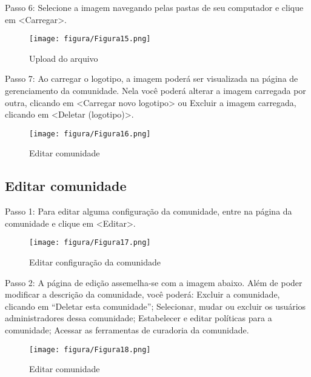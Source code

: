 \documentclass[12pt,hidelinks]{article}
\begin{document}
\newpage
    Passo 6: Selecione a imagem navegando pelas pastas de seu computador e clique em <Carregar>.
    
    \begin{figure}[!htp]
                \centering
                \texttt{[image: figura/Figura15.png]}
                \caption{Upload do arquivo}
            \label{Rotulo}
        \end{figure}
        
    Passo 7: Ao carregar o logotipo, a imagem poderá ser visualizada na página de gerenciamento da comunidade. Nela você poderá alterar a imagem carregada por outra, clicando em <Carregar novo logotipo> ou Excluir a imagem carregada, clicando em <Deletar (logotipo)>.
    
    \begin{figure}[!htp]
                \centering
                \texttt{[image: figura/Figura16.png]}
                \caption{Editar comunidade}
            \label{Rotulo}
        \end{figure}
        
    \subsection{Editar comunidade}
    
    Passo 1: Para editar alguma configuração da comunidade, entre na página da comunidade e clique em <Editar>.
    
    \begin{figure}[!htp]
                \centering
                \texttt{[image: figura/Figura17.png]}
                \caption{Editar configuração da comunidade}
            \label{Rotulo}
        \end{figure}
        
    Passo 2: A página de edição assemelha-se com a imagem abaixo. Além de poder modificar a descrição da comunidade, você poderá:
    \singlespacing
    Excluir a comunidade, clicando em “Deletar esta comunidade”;
    Selecionar, mudar ou excluir os usuários administradores dessa comunidade;
    Estabelecer e editar políticas para a comunidade;
    Acessar as ferramentas de curadoria da comunidade.
    
    \begin{figure}[!htp]
                \centering
                \texttt{[image: figura/Figura18.png]}
                \caption{Editar comunidade}
            \label{Rotulo}
        \end{figure}
        
\end{document}
